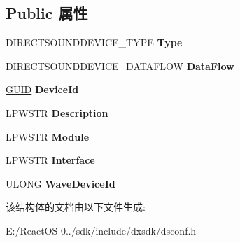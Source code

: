 \subsection*{Public 属性}
\begin{DoxyCompactItemize}
\item 
\mbox{\label{struct___d_s_p_r_o_p_e_r_t_y___d_i_r_e_c_t_s_o_u_n_d_d_e_v_i_c_e___d_e_s_c_r_i_p_t_i_o_n___w___d_a_t_a_a5581b47c9d965148289c2a46bf26196e}} 
D\+I\+R\+E\+C\+T\+S\+O\+U\+N\+D\+D\+E\+V\+I\+C\+E\+\_\+\+T\+Y\+PE {\bfseries Type}
\item 
\mbox{\label{struct___d_s_p_r_o_p_e_r_t_y___d_i_r_e_c_t_s_o_u_n_d_d_e_v_i_c_e___d_e_s_c_r_i_p_t_i_o_n___w___d_a_t_a_a92fcf18dc262a9f38b05bf8301ace243}} 
D\+I\+R\+E\+C\+T\+S\+O\+U\+N\+D\+D\+E\+V\+I\+C\+E\+\_\+\+D\+A\+T\+A\+F\+L\+OW {\bfseries Data\+Flow}
\item 
\mbox{\label{struct___d_s_p_r_o_p_e_r_t_y___d_i_r_e_c_t_s_o_u_n_d_d_e_v_i_c_e___d_e_s_c_r_i_p_t_i_o_n___w___d_a_t_a_abdfdd0911ae620103fb77187a76de8dd}} 
\hyperlink{interface_g_u_i_d}{G\+U\+ID} {\bfseries Device\+Id}
\item 
\mbox{\label{struct___d_s_p_r_o_p_e_r_t_y___d_i_r_e_c_t_s_o_u_n_d_d_e_v_i_c_e___d_e_s_c_r_i_p_t_i_o_n___w___d_a_t_a_a0ae0dadecf8c88a5cd6ff0cabcc7bf52}} 
L\+P\+W\+S\+TR {\bfseries Description}
\item 
\mbox{\label{struct___d_s_p_r_o_p_e_r_t_y___d_i_r_e_c_t_s_o_u_n_d_d_e_v_i_c_e___d_e_s_c_r_i_p_t_i_o_n___w___d_a_t_a_a09e0bf2486a3660ee01a564084c5ad0b}} 
L\+P\+W\+S\+TR {\bfseries Module}
\item 
\mbox{\label{struct___d_s_p_r_o_p_e_r_t_y___d_i_r_e_c_t_s_o_u_n_d_d_e_v_i_c_e___d_e_s_c_r_i_p_t_i_o_n___w___d_a_t_a_a6bb8effd7cd3431f5d7a46b77098dc7a}} 
L\+P\+W\+S\+TR {\bfseries Interface}
\item 
\mbox{\label{struct___d_s_p_r_o_p_e_r_t_y___d_i_r_e_c_t_s_o_u_n_d_d_e_v_i_c_e___d_e_s_c_r_i_p_t_i_o_n___w___d_a_t_a_afe8c844c59a4a53377d9f9a5f2f7aedc}} 
U\+L\+O\+NG {\bfseries Wave\+Device\+Id}
\end{DoxyCompactItemize}


该结构体的文档由以下文件生成\+:\begin{DoxyCompactItemize}
\item 
E\+:/\+React\+O\+S-\/0../sdk/include/dxsdk/dsconf.\+h\end{DoxyCompactItemize}
